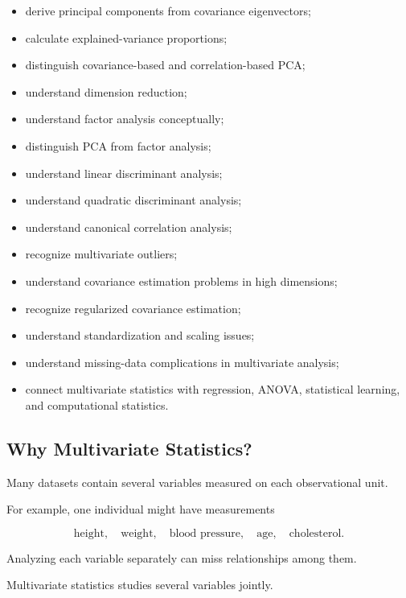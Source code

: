 {\begin{itemize}
    \item derive principal components from covariance eigenvectors;
    \item calculate explained-variance proportions;
    \item distinguish covariance-based and correlation-based PCA;
    \item understand dimension reduction;
    \item understand factor analysis conceptually;
    \item distinguish PCA from factor analysis;
    \item understand linear discriminant analysis;
    \item understand quadratic discriminant analysis;
    \item understand canonical correlation analysis;
    \item recognize multivariate outliers;
    \item understand covariance estimation problems in high dimensions;
    \item recognize regularized covariance estimation;
    \item understand standardization and scaling issues;
    \item understand missing-data complications in multivariate analysis;
    \item connect multivariate statistics with regression, ANOVA,
          statistical learning, and computational statistics.
\end{itemize}
}

\subsection{Why Multivariate Statistics?}
\label{subsec:why-multivariate-statistics}

Many datasets contain several variables measured on each observational
unit.

For example, one individual might have measurements

\[
\boxed{
\text{height},
\quad
\text{weight},
\quad
\text{blood pressure},
\quad
\text{age},
\quad
\text{cholesterol}.
}
\]

Analyzing each variable separately can miss relationships among them.

Multivariate statistics studies several variables jointly.

